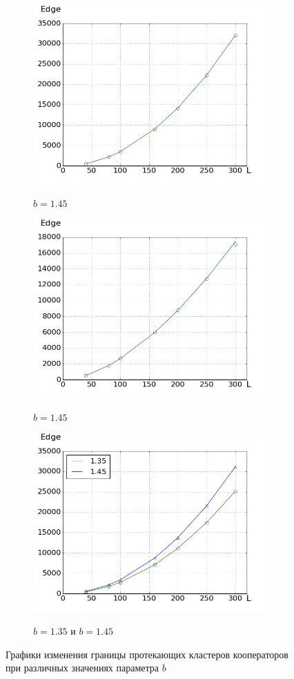 \documentclass[a4paper]{article}
\begin{document}
	
	\begin{figure}[H]
		
		\begin{subfigure}{.6\textwidth}
			\includegraphics[width=0.8\linewidth]{edge1.35-1.55.png}
			\label{edge1.45}
			\caption{$b=1.45$}
		\end{subfigure}%
		\begin{subfigure}{.6\textwidth}
			\includegraphics[width=0.8\linewidth]{edge1.45-1.55.png}
			\label{edge1.45}
			\caption{$b=1.45$}
		\end{subfigure}%
		
		\centering
		\begin{subfigure}{0.6\textwidth}
			\centering
			\includegraphics[width=0.8\linewidth]{edge1.35-1.45.png}
			\label{edge1.35-1.45}
			\caption{$b=1.35$ и $b=1.45$}
		\end{subfigure}%
	\caption{Графики изменения границы протекающих кластеров кооператоров при различных значениях параметра $b$}
	\end{figure}
	
\end{document}

